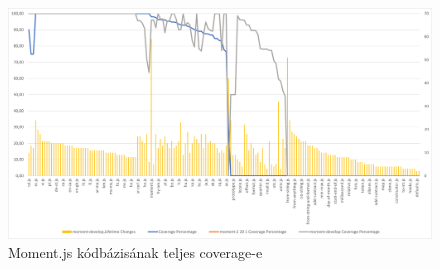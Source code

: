 \begin{figure}[H]
    \centering
    \includegraphics[width=1\textwidth]{images/moment/moment-all-coverage-full.png}
    \caption{Moment.js kódbázisának teljes coverage-e}
    \label{fig:moment-all-coverage-full}
\end{figure}